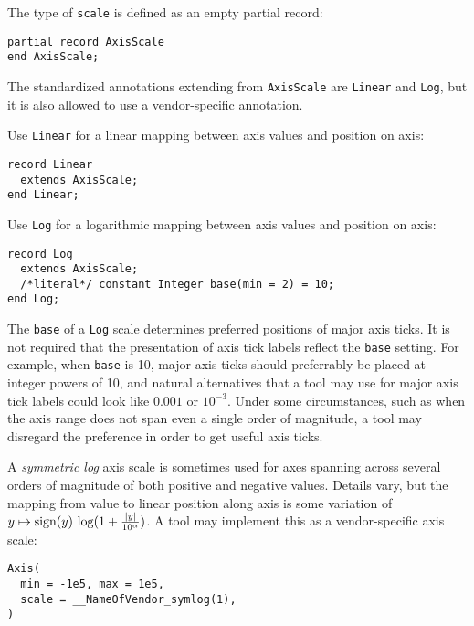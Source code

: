 The type of \lstinline!scale! is defined as an empty partial record:
\begin{lstlisting}[language=modelica]
partial record AxisScale
end AxisScale;
\end{lstlisting}%

The standardized annotations extending from \lstinline!AxisScale! are \lstinline!Linear! and  \lstinline!Log!, but it is also allowed to use a vendor-specific annotation.

Use \lstinline!Linear! for a linear mapping between axis values and position on axis:
\begin{lstlisting}[language=modelica]
record Linear
  extends AxisScale;
end Linear;
\end{lstlisting}%

Use \lstinline!Log! for a logarithmic mapping between axis values and position on axis:
\begin{lstlisting}[language=modelica]
record Log
  extends AxisScale;
  /*literal*/ constant Integer base(min = 2) = 10;
end Log;
\end{lstlisting}%

The \lstinline!base! of a \lstinline!Log! scale determines preferred positions of major axis ticks.
It is not required that the presentation of axis tick labels reflect the \lstinline!base! setting.
For example, when \lstinline!base! is 10, major axis ticks should preferrably be placed at integer powers of 10, and natural alternatives that a tool may use for major axis tick labels could look like $0.001$ or $10^{-3}$.
Under some circumstances, such as when the axis range does not span even a single order of magnitude, a tool may disregard the preference in order to get useful axis ticks.

\begin{example}
A \emph{symmetric log} axis scale is sometimes used for axes spanning across several orders of magnitude of both positive and negative values.
Details vary, but the mapping from value to linear position along axis is some variation of $y \mapsto \operatorname{sign}(y)\, \operatorname{log}(1 + \frac{\left\lvert y{} \right\rvert}{10^{\alpha}})$.
A tool may implement this as a vendor-specific axis scale:
\begin{lstlisting}[language=modelica]
Axis(
  min = -1e5, max = 1e5,
  scale = __NameOfVendor_symlog(1),
)
\end{lstlisting}
\end{example}

